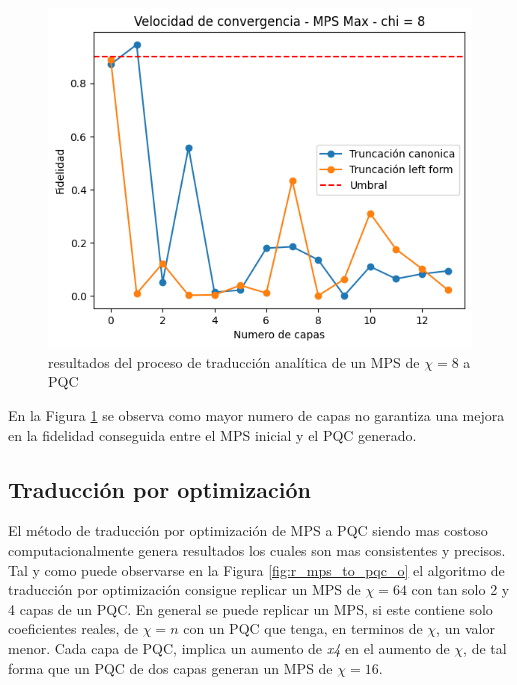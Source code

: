 \begin{figure}[!h]
    \centering
    \includegraphics[scale = 0.7]{plt/a03-mps_to_pqc_a_2.png}
    \caption{resultados del proceso de traducción analítica de un MPS de $\chi = 8$ a PQC}
    \label{fig:r_mps_to_pqc_a_2}
\end{figure}

En la Figura \ref{fig:r_mps_to_pqc_a_2} se observa como mayor numero de capas no garantiza una mejora en la fidelidad conseguida entre el MPS inicial y el PQC generado.

\subsection{Traducción por optimización}

El método de traducción por optimización de MPS a PQC siendo mas costoso computacionalmente genera resultados los cuales son mas consistentes y precisos. Tal y como puede observarse en la Figura \ref{fig:r_mps_to_pqc_o} el algoritmo de traducción por optimización consigue replicar un MPS de $\chi = 64$ con tan solo 2 y 4 capas de un PQC. En general se puede replicar un MPS, si este contiene solo coeficientes reales, de $\chi = n$ con un PQC que tenga, en terminos de $\chi$, un valor menor. Cada capa de PQC, implica un aumento de \textit{x4} en el aumento de $\chi$, de tal forma que un PQC de dos capas generan un MPS de $\chi = 16$.

\newpage

